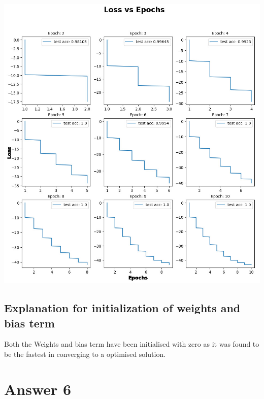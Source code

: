 \documentclass{article}
\begin{document}
\begin{itemize}
\includegraphics[scale=0.4]{images/Loss.jpeg}
\end{itemize}

\subsection{Explanation for initialization of weights and bias term}
Both the Weights and bias term have been initialised with zero as it was found to be the fastest in converging to a optimised solution.

\section{Answer 6}
\label{A6}
\end{document}
